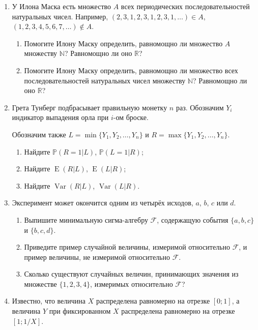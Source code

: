 \documentclass[11pt]{article}
\DeclareMathOperator{\Var}{Var}
\DeclareMathOperator{\E}{E}
\renewcommand{\P}{\mathbb{P}}
\begin{document}
\begin{enumerate}

\item У Илона Маска есть множество $A$ всех периодических последовательностей натуральных чисел.
Например, $(2, 3, 1, 2, 3, 1, 2, 3, 1, \ldots) \in A$,
$(1, 2, 3, 4, 5, 6, 7, \ldots) \notin A$.

\begin{enumerate}
  \item Помогите Илону Маску определить,  равномощно ли множество $A$ множеству $\mathbb{N}$? 
  Равномощно ли оно $\mathbb{R}$?
 \item Помогите Илону Маску определить,  равномощно ли множество всех последовательностей натуральных чисел 
 множеству $\mathbb{N}$? 
 Равномощно ли оно $\mathbb{R}$?
\end{enumerate}



\item Грета Тунберг подбрасывает правильную монетку $n$ раз. 
Обозначим $Y_i$ индикатор выпадения орла при $i$-ом броске. 

Обозначим также $L = \min \{Y_1, Y_2, \ldots, Y_n\}$ и $R = \max \{Y_1, Y_2, \ldots, Y_n\}$.

\begin{enumerate}
  \item Найдите $\P(R=1|L)$, $\P(L=1|R)$;
  \item Найдите $\E(R|L)$, $\E(L|R)$;
  \item Найдите $\Var(R|L)$, $\Var(L|R)$.
\end{enumerate}


\item Эксперимент может окончится одним из четырёх исходов, $a$, $b$, $c$ или $d$.

\begin{enumerate}
  \item Выпишите минимальную сигма-алгебру $\mathcal{F}$, содержащую события $\{a,b,c\}$ и $\{b,c,d\}$.
  \item Приведите пример случайной величины, измеримой относительно $\mathcal{F}$, и пример величины,
  не измеримой относительно $\mathcal{F}$.
  \item Сколько существуют случайных величин, принимающих значения из множестве $\{1, 2, 3, 4\}$, 
  измеримых относительно $\mathcal{F}$?
\end{enumerate}


\item Известно, что величина $X$ распределена равномерно на отрезке $[0;1]$, 
а величина $Y$ при фиксированном $X$ распределена равномерно на отрезке $[1; 1/X]$.


\end{enumerate}
\end{document}
